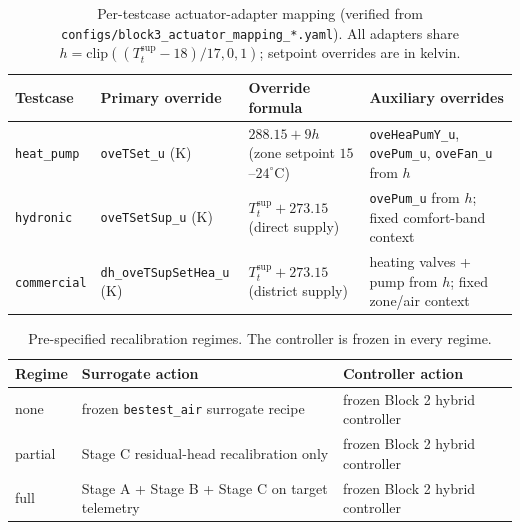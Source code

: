 \documentclass[11pt,a4paper]{article}
\begin{document}
\begin{table}[pos={!ht}]
\centering
\small
\caption{Per-testcase actuator-adapter mapping (verified from \texttt{configs/block3\_actuator\_mapping\_*.yaml}). All adapters share $h=\mathrm{clip}((T^{\mathrm{sup}}_t-18)/17,0,1)$; setpoint overrides are in kelvin.}
\label{tab:adapters}
\begin{tabularx}{\linewidth}{l l >{\raggedright\arraybackslash}p{40mm} >{\raggedright\arraybackslash}X}
\toprule
Testcase & Primary override & Override formula & Auxiliary overrides \\
\midrule
\texttt{heat\_pump} & \texttt{oveTSet\_u} (K) & $288.15+9h$ (zone setpoint $15$--$24^\circ$C) & \texttt{oveHeaPumY\_u}, \texttt{ovePum\_u}, \texttt{oveFan\_u} from $h$ \\
\texttt{hydronic} & \texttt{oveTSetSup\_u} (K) & $T^{\mathrm{sup}}_t+273.15$ (direct supply) & \texttt{ovePum\_u} from $h$; fixed comfort-band context \\
\texttt{commercial} & \texttt{dh\_oveTSupSetHea\_u} (K) & $T^{\mathrm{sup}}_t+273.15$ (district supply) & heating valves + pump from $h$; fixed zone/air context \\
\bottomrule
\end{tabularx}
\end{table}

\begin{table}[pos={!ht}]
\centering
\small
\caption{Pre-specified recalibration regimes. The controller is frozen in every regime.}
\label{tab:regimes}
\begin{tabular}{lll}
\toprule
Regime & Surrogate action & Controller action \\
\midrule
none & frozen \texttt{bestest\_air} surrogate recipe & frozen Block 2 hybrid controller \\
partial & Stage C residual-head recalibration only & frozen Block 2 hybrid controller \\
full & Stage A + Stage B + Stage C on target telemetry & frozen Block 2 hybrid controller \\
\bottomrule
\end{tabular}
\end{table}
\end{document}
